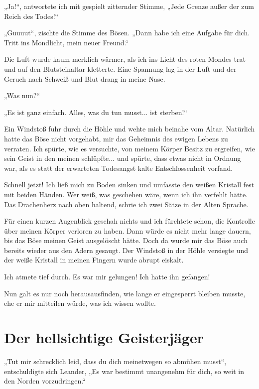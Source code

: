 „Ja!“, antwortete ich mit gespielt zitternder Stimme, „Jede Grenze außer der zum Reich des Todes!“

„Guuuut“, zischte die Stimme des Bösen. „Dann habe ich eine Aufgabe für dich. Tritt ins Mondlicht, mein neuer Freund.“

Die Luft wurde kaum merklich wärmer, als ich ins Licht des roten Mondes trat und auf den Blutsteinaltar kletterte. Eine Spannung lag in der Luft und der Geruch nach Schweiß und Blut drang in meine Nase.

„Was nun?“

„Es ist ganz einfach. Alles, was du tun musst... ist sterben!“

Ein Windstoß fuhr durch die Höhle und wehte mich beinahe vom Altar. Natürlich hatte das Böse nicht vorgehabt, mir das Geheimnis des ewigen Lebens zu verraten. Ich spürte, wie es versuchte, von meinem Körper Besitz zu ergreifen, wie sein Geist in den meinen schlüpfte... und spürte, dass etwas nicht in Ordnung war, als es statt der erwarteten Todesangst kalte Entschlossenheit vorfand.

Schnell jetzt! Ich ließ mich zu Boden sinken und umfasste den weißen Kristall fest mit beiden Händen. Wer weiß, was geschehen wäre, wenn ich ihn verfehlt hätte. Das Drachenherz nach oben haltend, schrie ich zwei Sätze in der Alten Sprache.

Für einen kurzen Augenblick geschah nichts und ich fürchtete schon, die Kontrolle über meinen Körper verloren zu haben. Dann würde es nicht mehr lange dauern, bis das Böse meinen Geist ausgelöscht hätte. Doch da wurde mir das Böse auch bereits wieder aus den Adern gesaugt. Der Windstoß in der Höhle versiegte und der weiße Kristall in meinen Fingern wurde abrupt eiskalt.

Ich atmete tief durch. Es war mir gelungen! Ich hatte ihn gefangen!

Nun galt es nur noch herausausfinden, wie lange er eingesperrt bleiben musste, ehe er mir mitteilen würde, was ich wissen wollte.





\newpage
\section{Der hellsichtige Geisterjäger}

„Tut mir schrecklich leid, dass du dich meinetwegen so abmühen musst“, entschuldigte sich Leander, „Es war bestimmt unangenehm für dich, so weit in den Norden vorzudringen.“

